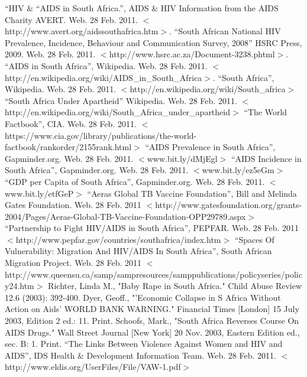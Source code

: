 \documentclass[12pt]{report}
\begin{document}
\begin{thebibliography}{99}
    ``HIV \& ``AIDS in South Africa.'',
        AIDS \& HIV Information from the AIDS Charity AVERT. Web. 28 Feb. 2011. $<$http://www.avert.org/aidssouthafrica.htm$>$.
    ``South African National HIV Prevalence, Incidence, Behaviour and Communication Survey, 2008''
        HSRC Press, 2009. Web. 28 Feb. 2011. $<$http://www.hsrc.ac.za/Document-3238.phtml$>$. 
    ``AIDS in South Africa'',
        Wikipedia. Web. 28 Feb. 2011. $<$http://en.wikipedia.org/wiki/AIDS\_in\_South\_Africa$>$.
    ``South Africa'',
        Wikipedia. Web. 28 Feb. 2011. $<$http://en.wikipedia.org/wiki/South\_africa$>$
    ``South Africa Under Apartheid''
        Wikipedia. Web. 28 Feb. 2011. $<$http://en.wikipedia.org/wiki/South\_Africa\_under\_apartheid$>$
    ``The World Factbook'',
        CIA. Web. 28 Feb. 2011. $<$https://www.cia.gov/library/publications/the-world-factbook/rankorder/2155rank.html$>$
    ``AIDS Prevalence in South Africa'',
        Gapminder.org. Web. 28 Feb. 2011. $<$www.bit.ly/dMjEgl$>$
    ``AIDS Incidence in South Africa'',
        Gapminder.org. Web. 28 Feb. 2011. $<$www.bit.ly/ez5eGm$>$
    ``GDP per Capita of South Africa'',
        Gapminder.org. Web. 28 Feb. 2011. $<$www.bit.ly/etfGeP$>$
    ``Aeras Global TB Vaccine Foundation'',
        Bill and Melinda Gates Foundation. Web. 28 Feb. 2011 $<$http://www.gatesfoundation.org/grants-2004/Pages/Aeras-Global-TB-Vaccine-Foundation-OPP29789.aspx$>$
    ``Partnership to Fight HIV/AIDS in South Africa'',
        PEPFAR. Web. 28 Feb. 2011 $<$http://www.pepfar.gov/countries/southafrica/index.htm$>$
    ``Spaces Of Vulnerability: Migration And HIV/AIDS In South Africa'', 
        South African Migration Project. Web. 28 Feb. 2011 $<$http://www.queensu.ca/samp/sampresources/samppublications/policyseries/policy24.htm$>$
    Richter, Linda M.,
        "Baby Rape in South Africa." Child Abuse Review 12.6 (2003): 392-400.
    Dyer, Geoff.,
        "'Economic Collapse in S Africa Without Action on Aids' WORLD BANK WARNING." Financial Times [London] 15 July 2003, Edition 2 ed.: 11. Print.
    Schoofs, Mark.,
        "South Africa Reverses Course On AIDS Drugs." Wall Street Journal [New York] 20 Nov. 2003, Eastern Edition ed., sec. B: 1. Print.
    ``The Links Between Violence Against Women and HIV and AIDS'',
        IDS Health \& Development Information Team. Web. 28 Feb. 2011. $<$http://www.eldis.org/UserFiles/File/VAW-1.pdf$>$
\end{thebibliography}
\end{document}
